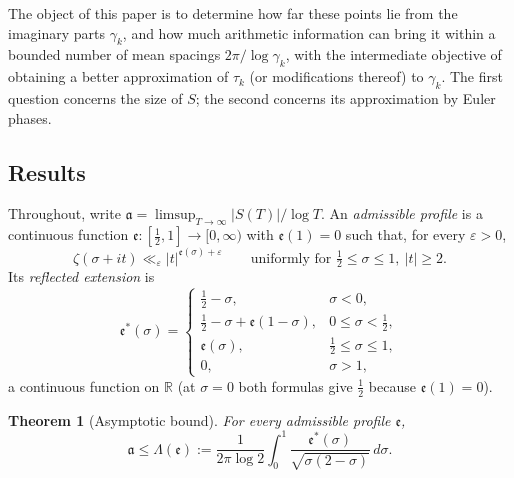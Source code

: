 \documentclass[11pt,a4paper]{article}
\numberwithin{equation}{section}
\newtheorem{theorem}{Theorem}[section]
\theoremstyle{definition}
\theoremstyle{remark}
\newcommand{\R}{\mathbb R}
\begin{document}
The object of this paper is to determine how far these points lie from the imaginary parts $\gamma_k$, and how much arithmetic information can bring it within a bounded number of mean spacings $2\pi/\log\gamma_k$, with the intermediate objective of obtaining a better approximation of $\tau_k$ (or modifications thereof) to $\gamma_k$. The first question concerns the size of $S$; the second concerns its approximation by Euler phases.

\subsection{Results}\label{subsec:results}
Throughout, write $\mathfrak a=\limsup_{T\to\infty}|S(T)|/\log T$. An \emph{admissible profile} is a continuous function $\mathfrak e:[\frac12,1]\to[0,\infty)$ with $\mathfrak e(1)=0$ such that, for every $\varepsilon>0$,
\begin{equation}
\zeta(\sigma+it)\ll_\varepsilon|t|^{\mathfrak e(\sigma)+\varepsilon}\qquad\text{uniformly for }\tfrac12\le\sigma\le1,\ |t|\ge2 .
\label{eq:admissible}
\end{equation}
Its \emph{reflected extension} is
\begin{equation}
\mathfrak e^*(\sigma)=\begin{cases}\frac12-\sigma,&\sigma<0,\\ \frac12-\sigma+\mathfrak e(1-\sigma),&0\le\sigma<\frac12,\\ \mathfrak e(\sigma),&\frac12\le\sigma\le1,\\ 0,&\sigma>1,\end{cases}
\label{eq:reflected}
\end{equation}
a continuous function on $\R$ (at $\sigma=0$ both formulas give $\frac12$ because $\mathfrak e(1)=0$).

\begin{theorem}[Asymptotic bound]\label{thm:asymptotic}
For every admissible profile $\mathfrak e$,
\begin{equation}
\mathfrak a\le\Lambda(\mathfrak e):=\frac1{2\pi\log2}\int_0^1\frac{\mathfrak e^*(\sigma)}{\sqrt{\sigma(2-\sigma)}}\,d\sigma .
\label{eq:asymptotic_formula}
\end{equation}
\end{theorem}
\end{document}
